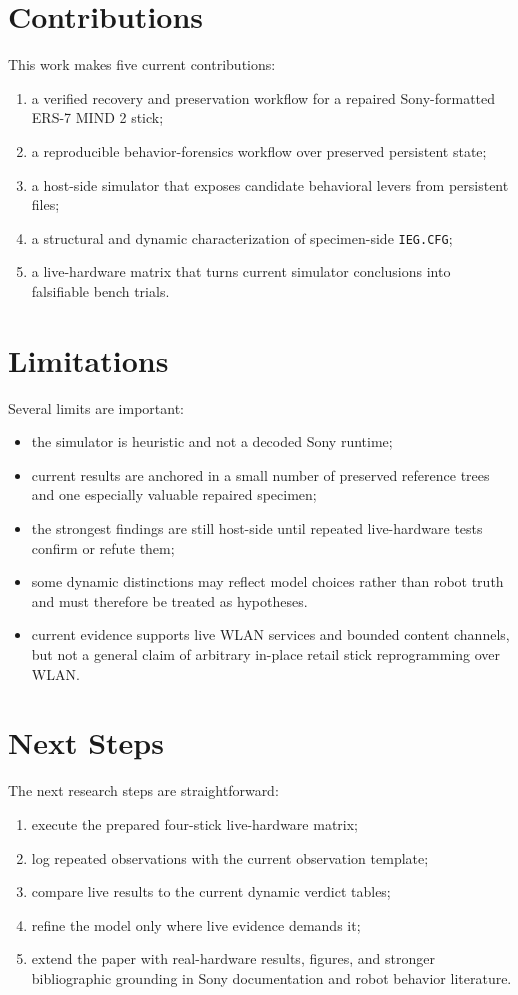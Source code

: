 \section{Contributions}
This work makes five current contributions:
\begin{enumerate}[leftmargin=*]
\item a verified recovery and preservation workflow for a repaired Sony-formatted
ERS-7 MIND 2 stick;
\item a reproducible behavior-forensics workflow over preserved persistent state;
\item a host-side simulator that exposes candidate behavioral levers from
persistent files;
\item a structural and dynamic characterization of specimen-side
\texttt{IEG.CFG};
\item a live-hardware matrix that turns current simulator conclusions into
falsifiable bench trials.
\end{enumerate}

\section{Limitations}
Several limits are important:
\begin{itemize}[leftmargin=*]
\item the simulator is heuristic and not a decoded Sony runtime;
\item current results are anchored in a small number of preserved reference
trees and one especially valuable repaired specimen;
\item the strongest findings are still host-side until repeated live-hardware
tests confirm or refute them;
\item some dynamic distinctions may reflect model choices rather than robot
truth and must therefore be treated as hypotheses.
\item current evidence supports live WLAN services and bounded content channels,
but not a general claim of arbitrary in-place retail stick reprogramming over
WLAN.
\end{itemize}

\section{Next Steps}
The next research steps are straightforward:
\begin{enumerate}[leftmargin=*]
\item execute the prepared four-stick live-hardware matrix;
\item log repeated observations with the current observation template;
\item compare live results to the current dynamic verdict tables;
\item refine the model only where live evidence demands it;
\item extend the paper with real-hardware results, figures, and stronger
bibliographic grounding in Sony documentation and robot behavior literature.
\end{enumerate}

